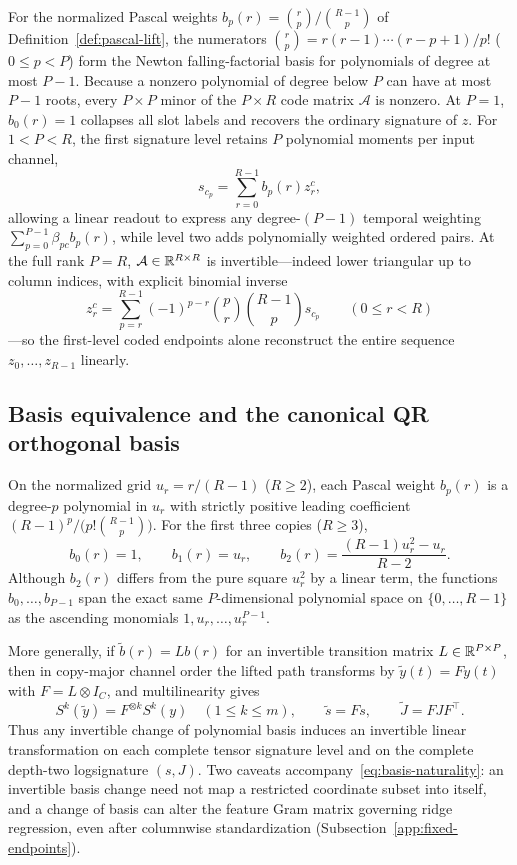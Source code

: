 For the normalized Pascal weights \(b_p(r) = \binom{r}{p} / \binom{R-1}{p}\) of
Definition~\ref{def:pascal-lift}, the numerators \(\binom{r}{p} = r(r-1)\cdots(r-p+1)/p!\)
(\(0 \leq p < P\)) form the Newton falling-factorial basis for polynomials of
degree at most \(P-1\). Because a nonzero polynomial of degree below \(P\) can
have at most \(P-1\) roots, every \(P \times P\) minor of the \(P \times R\)
code matrix \(\mathcal A\) is nonzero. At \(P = 1\), \(b_0(r) = 1\) collapses all
slot labels and recovers the ordinary signature of \(z\). For \(1 < P < R\), the
first signature level retains \(P\) polynomial moments per input channel,
\begin{equation}\label{eq:offset-moments}
 s_{c_p} = \sum_{r=0}^{R-1} b_p(r) z_r^c,
\end{equation}
allowing a linear readout to express any degree-\((P-1)\) temporal weighting
\(\sum_{p=0}^{P-1} \beta_{pc} b_p(r)\), while level two adds polynomially
weighted ordered pairs. At the full rank \(P = R\), \(\mathcal A \in \mathbb{R}^{R \times R}\)
is invertible---indeed lower triangular up to column indices, with explicit
binomial inverse
\[
 z_r^c = \sum_{p=r}^{R-1} (-1)^{p-r} \binom{p}{r}\binom{R-1}{p} s_{c_p}
 \qquad (0 \leq r < R)
\]
---so the first-level coded endpoints alone reconstruct the entire sequence
\(z_0, \ldots, z_{R-1}\) linearly.

\subsection{Basis equivalence and the canonical QR orthogonal basis}\label{app:qr}
On the normalized grid \(u_r = r/(R-1)\) (\(R \geq 2\)), each Pascal weight
\(b_p(r)\) is a degree-\(p\) polynomial in \(u_r\) with strictly positive
leading coefficient \((R-1)^p / \bigl(p!\binom{R-1}{p}\bigr)\). For the first
three copies (\(R \geq 3\)),
\[
 b_0(r) = 1, \qquad
 b_1(r) = u_r, \qquad
 b_2(r) = \frac{(R-1)u_r^2 - u_r}{R-2}.
\]
Although \(b_2(r)\) differs from the pure square \(u_r^2\) by a linear term,
the functions \(b_0, \ldots, b_{P-1}\) span the exact same \(P\)-dimensional
polynomial space on \(\{0, \ldots, R-1\}\) as the ascending monomials
\(1, u_r, \ldots, u_r^{P-1}\).

More generally, if \(\widetilde b(r) = L b(r)\) for an invertible transition
matrix \(L \in \mathbb{R}^{P \times P}\), then in copy-major channel order the lifted
path transforms by \(\widetilde y(t) = F y(t)\) with \(F = L \otimes I_C\), and
multilinearity gives
\begin{equation}\label{eq:basis-naturality}
 S^k(\widetilde y) = F^{\otimes k} S^k(y) \quad (1 \leq k \leq m), \qquad
 \widetilde s = F s, \qquad
 \widetilde J = F J F^\top.
\end{equation}
Thus any invertible change of polynomial basis induces an invertible linear
transformation on each complete tensor signature level and on the complete
depth-two logsignature \((s, J)\). Two caveats accompany~\eqref{eq:basis-naturality}:
an invertible basis change need not map a restricted coordinate subset into
itself, and a change of basis can alter the feature Gram matrix governing ridge
regression, even after columnwise standardization
(Subsection~\ref{app:fixed-endpoints}).

